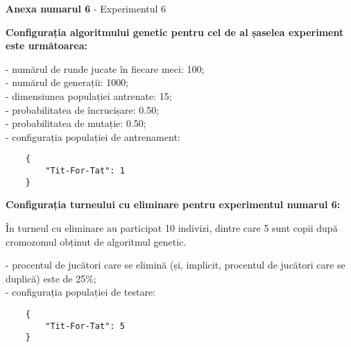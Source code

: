 \clearpage

\begin{center}
	\textbf{Anexa numarul 6} - Experimentul 6
\end{center}

\textbf{Configurația algoritmului genetic pentru cel de al șaselea experiment este următoarea:}

- numărul de runde jucate în fiecare meci: 100;\\
- numărul de generații: 1000;\\
- dimensiunea populației antrenate: 15;\\
- probabilitatea de încrucișare: 0.50;\\
- probabilitatea de mutație: 0.50;\\
- configurația populației de antrenament:\\
\begin{center}
	\begin{lstlisting}
	{
		"Tit-For-Tat": 1
	}
	\end{lstlisting}
\end{center}

\textbf{Configurația turneului cu eliminare pentru experimentul numarul 6: }

În turneul cu eliminare au participat 10 indivizi, dintre care 5 sunt copii după cromozomul obținut de algoritmul genetic. 

- procentul de jucători care se elimină (și, implicit, procentul de jucători care se duplică) este de 25\%;\\
- configurația populației de testare:\\
\begin{center}
	\begin{lstlisting}
	{
		"Tit-For-Tat": 5
	}
	\end{lstlisting}
\end{center}